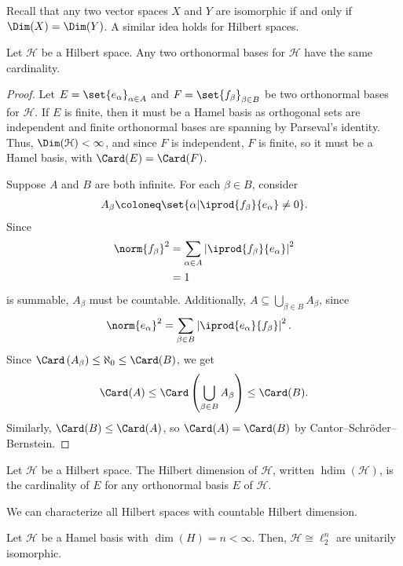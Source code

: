 \documentclass[10pt]{mypackage}
\DeclareMathOperator{\hdim}{hdim}
\begin{document}
Recall that any two vector spaces $X$ and $Y$ are isomorphic if and only if $\Dim(X) = \Dim(Y)$. A similar idea holds for Hilbert spaces.
\begin{proposition}[]
Let $\mathcal{H}$ be a Hilbert space. Any two orthonormal bases for $\mathcal{H}$ have the same cardinality.
\end{proposition}
\begin{proof}
  Let $E = \set{e_{\alpha}}_{\alpha \in A}$ and $F = \set{f_{\beta}}_{\beta \in B}$ be two orthonormal bases for $\mathcal{H}$. If $E$ is finite, then it must be a Hamel basis as orthogonal sets are independent and finite orthonormal bases are spanning by Parseval's identity. Thus, $\Dim(\mathcal{H}) < \infty$, and since $F$ is independent, $F$ is finite, so it must be a Hamel basis, with $\Card(E) = \Card(F)$.\newline

  Suppose $A$ and $B$ are both infinite. For each $\beta \in B$, consider
  \begin{align*}
    A_{\beta} \coloneq \set{\alpha | \iprod{f_{\beta}}{e_{\alpha}} \neq 0}.
  \end{align*}
  Since
  \begin{align*}
    \norm{f_{\beta}}^2 &= \sum_{\alpha \in A} \left\vert \iprod{f_{\beta}}{e_{\alpha}} \right\vert^2\\
                       &= 1
  \end{align*}
  is summable, $A_{\beta}$ must be countable. Additionally, $A\subseteq \bigcup_{\beta \in B}A_{\beta}$, since
  \begin{align*}
    \norm{e_{\alpha}}^2 &= \sum_{\beta \in B}\left\vert \iprod{e_{\alpha}}{f_{\beta}} \right\vert^2.
  \end{align*}
  Since $\Card\left(A_{\beta}\right) \leq \aleph_0\leq \Card(B)$, we get
  \begin{align*}
    \Card(A) \leq \Card\left(\bigcup_{\beta \in B}A_{\beta}\right)\leq \Card(B).
  \end{align*}
  Similarly, $\Card(B) \leq \Card(A)$, so $\Card(A) = \Card(B)$ by Cantor--Schröder--Bernstein.
\end{proof}
\begin{definition}
  Let $\mathcal{H}$ be a Hilbert space. The Hilbert dimension of $\mathcal{H}$, written $\hdim(\mathcal{H})$, is the cardinality of $E$ for any orthonormal basis $E$ of $\mathcal{H}$.
\end{definition}
We can characterize all Hilbert spaces with countable Hilbert dimension.
\begin{proposition}
  Let $\mathcal{H}$ be a Hamel basis with $\dim(H) = n < \infty$. Then, $\mathcal{H} \cong \ell_2^{n}$ are unitarily isomorphic.
\end{proposition}
\end{document}
